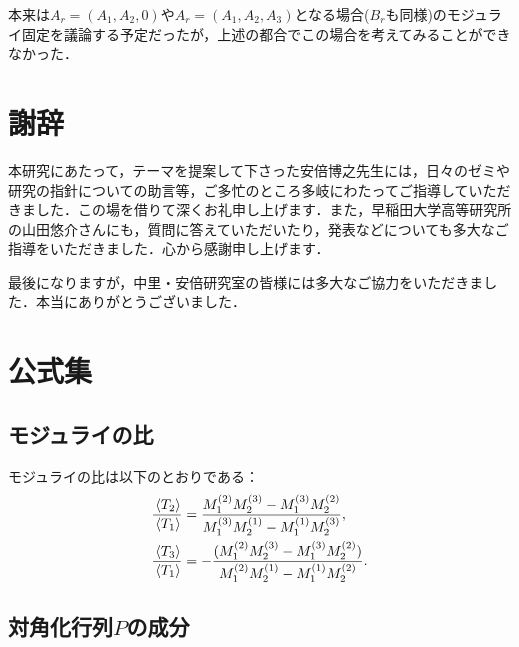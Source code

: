 \documentclass[a4paper,uplatex,dvipdfmx]{jsarticle}
\theoremstyle{definition}
\renewcommand{\theequation}{\thesection.\arabic{equation}}
\renewcommand{\thefigure}{\thesection.\arabic{figure}}
\renewcommand{\thetable}{\thesection.\arabic{table}}
\begin{document}
本来は$A_{r}=(A_{1},A_{2},0)$や$A_{r}=(A_{1},A_{2},A_{3})$となる場合($B_{r}$も同様)のモジュライ固定を議論する予定だったが，上述の都合でこの場合を考えてみることができなかった．


\section*{謝辞}

本研究にあたって，テーマを提案して下さった安倍博之先生には，日々のゼミや研究の指針についての助言等，ご多忙のところ多岐にわたってご指導していただきました．この場を借りて深くお礼申し上げます．また，早稲田大学高等研究所の山田悠介さんにも，質問に答えていただいたり，発表などについても多大なご指導をいただきました．心から感謝申し上げます．

最後になりますが，中里・安倍研究室の皆様には多大なご協力をいただきました．本当にありがとうございました．


\appendix
\makeatletter
\renewcommand{\appendix}{\par
  \setcounter{section}{0}%
  \setcounter{subsection}{0}%
  \gdef\presectionname{\appendixname}%
  \gdef\postsectionname{}%
  \gdef\thesection{\presectionname\@Alph\c@section\postsectionname}%
  \gdef\thesubsection{\@Alph\c@section.\@arabic\c@subsection}%
  \renewcommand{\theequation}{\@Alph\c@section.\arabic{equation}}%
  \renewcommand{\thefigure}{\@Alph\c@section.\arabic{figure}}%
  \renewcommand{\thetable}{\@Alph\c@section.\arabic{table}}%
}
\makeatother
\appendix

\section{公式集}

\subsection{モジュライの比}
\label{ratio_moduli}

モジュライの比は以下のとおりである：
\begin{align}
   \frac{\ev*{T_{2}}}{\ev*{T_{1}}}
   &=
   \frac{ M_{1}^{(2)} M_{2}^{(3)}- M_{1}^{(3)} M_{2}^{(2)}}{M_{1}^{(3)} M_{2}^{(1)}-M_{1}^{(1)} M_{2}^{(3)}}
   ,
   \\
   \frac{\ev*{T_{3}}}{\ev*{T_{1}}}
   &=
   -\frac{ (M_{1}^{(2)} M_{2}^{(3)}-M_{1}^{(3)} M_{2}^{(2)})}{M_{1}^{(2)} M_{2}^{(1)}-M_{1}^{(1)} M_{2}^{(2)}}
   .
\end{align}


\subsection{対角化行列\texorpdfstring{$P$}{P}の成分}
\label{diagonalize_mat}
\end{document}
